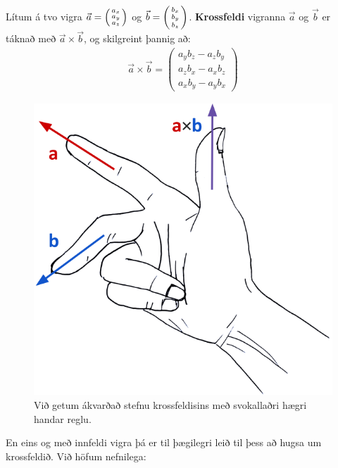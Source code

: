 \begin{tcolorbox}
\begin{definition}
Lítum á tvo vigra $\Vec{a} = \smqty(a_x \\ a_y \\ a_z)$ og $\Vec{b} = \smqty(b_x \\ b_y \\ b_z)$. \textbf{Krossfeldi} vigranna $\Vec{a}$ og $\Vec{b}$ er táknað með $\Vec{a} \times \Vec{b}$, og skilgreint þannig að:
\begin{align*}
    \Vec{a} \times \Vec{b} = \begin{pmatrix}
    a_y b_z - a_z b_y \\
    a_zb_x - a_x b_z \\
    a_x b_y - a_y b_x
    \end{pmatrix}
\end{align*}
\end{definition}
\end{tcolorbox}

\begin{figure}[H]
    \centering
    \includegraphics[scale = 0.2]{temp/hhr.png}
    \caption{Við getum ákvarðað stefnu krossfeldisins með svokallaðri hægri handar reglu.}
    \label{fig:rhr}
\end{figure}

En eins og með innfeldi vigra þá er til þægilegri leið til þess að hugsa um krossfeldið. Við höfum nefnilega:

